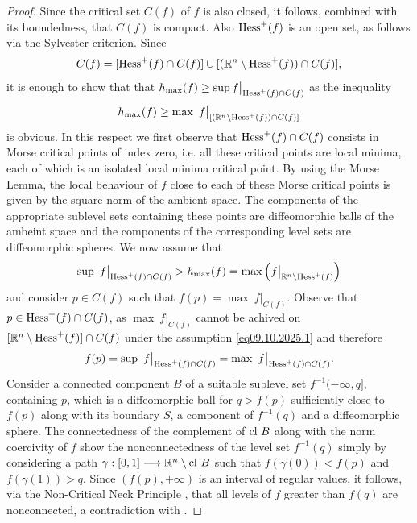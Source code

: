 \documentclass[12pt,twoside,reqno]{amsart}
\theoremstyle{definition}
\numberwithin{equation}{section}
\begin{document}
\begin{proof}
Since the critical set $C(f)$ of $f$ is also closed, it follows, combined with its boundedness, that  $C(f)$  is 
compact. Also ${\rm Hess}^+(f)$ is an open set, as follows via the Sylvester criterion.
Since \[C(f)=[{\rm Hess}^+(f)\cap C(f)]\cup[(\mathbb{R}^n\setminus {\rm Hess}^+(f))\cap C(f)],\] it is enough to show that 
that $h_{\max}(f)\geq\sup f\big|_{{\rm Hess}^+(f)\cap C(f)}$ as the inequality \[h_{\max}(f)\geq \max~f\big|_{[(\mathbb{R}^n\setminus {\rm Hess}^+(f))\cap C(f)]}\] is obvious.
In this respect we first observe that ${\rm Hess}^+(f)\cap C(f)$ consists in Morse critical points of index zero, i.e. all these critical points are 
local minima, each of which is an isolated local minima critical point. By using the Morse Lemma, the local behaviour of $f$
close to each of these Morse critical points is given by the square norm of 
the ambient space. The components of the appropriate sublevel sets containing these points are diffeomorphic balls of the ambeint space and the components of the corresponding level sets are diffeomorphic spheres. We now assume that  
\begin{equation}\sup~f\big|_{{\rm Hess}^+(f)\cap C(f)}>h_{\max}(f)=\max\left(f\big|_{\mathbb{R}^n\setminus {\rm Hess}^+(f)}\right)\label{eq09.10.2025.1}\end{equation} and consider 
$p\in C(f)$ such that $f(p)=\max~f\big|_{C(f)}$. Observe that $p\in {\rm Hess}^+(f)\cap C(f)$, 
as $\max~f\big|_{C(f)}$ cannot be achived on $[\mathbb{R}^n\setminus {\rm Hess}^+(f)]\cap C(f)$ under the assumption \eqref{eq09.10.2025.1} and therefore
\[
f(p)=\sup~f\big|_{{\rm Hess}^+(f)\cap C(f)}=\max~f\big|_{{\rm Hess}^+(f)\cap C(f)}.
\]
Consider a connected component $B$ of a suitable sublevel set $f^{-1}(-\infty,q]$, containing $p$, 
which is a diffeomorphic ball for $q>f(p)$ sufficiently close to $f(p)$ along with its boundary $S$, 
a component of $f^{-1}(q)$ and a diffeomorphic sphere. The connectedness of the complement of ${\rm cl}~B$ along with the norm coercivity of $f$ 
show the nonconnectedness of the level set $f^{-1}(q)$ simply by considering a path $\gamma:[0,1]\longrightarrow \mathbb{R}^n\setminus {\rm cl}~B$
such that $f(\gamma(0))<f(p)$ and $f(\gamma(1))>q$. Since $(f(p),+\infty)$ is an interval of regular values, it follows, via the Non-Critical Neck Principle
\cite[p.194]{Palais-Terng}, that all levels of $f$ greater than $f(q)$ are nonconnected, a contradiction with \cite[Theorem 3.7]{Bro-Pi}.
\end{proof}
\end{document}
